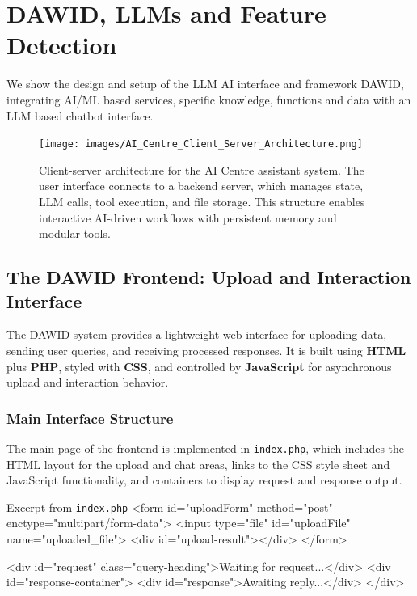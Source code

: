 \chapter{DAWID, LLMs and Feature Detection}

We show the design and setup of the LLM AI interface and framework DAWID, integrating AI/ML based services, specific knowledge, functions and data with an LLM based chatbot interface. 

\begin{figure}[htbp]
    \centering
    \texttt{[image: images/AI\_Centre\_Client\_Server\_Architecture.png]}
    \caption{Client-server architecture for the AI Centre assistant system. The user interface connects to a backend server, which manages state, LLM calls, tool execution, and file storage. This structure enables interactive AI-driven workflows with persistent memory and modular tools.}
    \label{fig:ai-centre-architecture}
\end{figure}

%
\section{The DAWID Frontend: Upload and Interaction Interface}

The DAWID system provides a lightweight web interface for uploading data, sending user queries, and receiving processed responses. It is built using {\bf HTML} plus {\bf PHP}, styled with {\bf CSS}, and controlled by {\bf JavaScript} for asynchronous upload and interaction behavior.

%
\subsection*{Main Interface Structure}

The main page of the frontend is implemented in \texttt{index.php}, which includes the HTML layout for the upload and chat areas, links to the CSS style sheet and JavaScript functionality, and containers to display request and response output.

\begin{codeonly}{Excerpt from \texttt{index.php}}
<form id="uploadForm" method="post" enctype="multipart/form-data">
  <input type="file" id="uploadFile" name="uploaded_file">
  <div id="upload-result"></div>
</form>

<div id="request" class="query-heading">Waiting for request...</div>
<div id="response-container">
  <div id="response">Awaiting reply...</div>
</div>
\end{codeonly}

